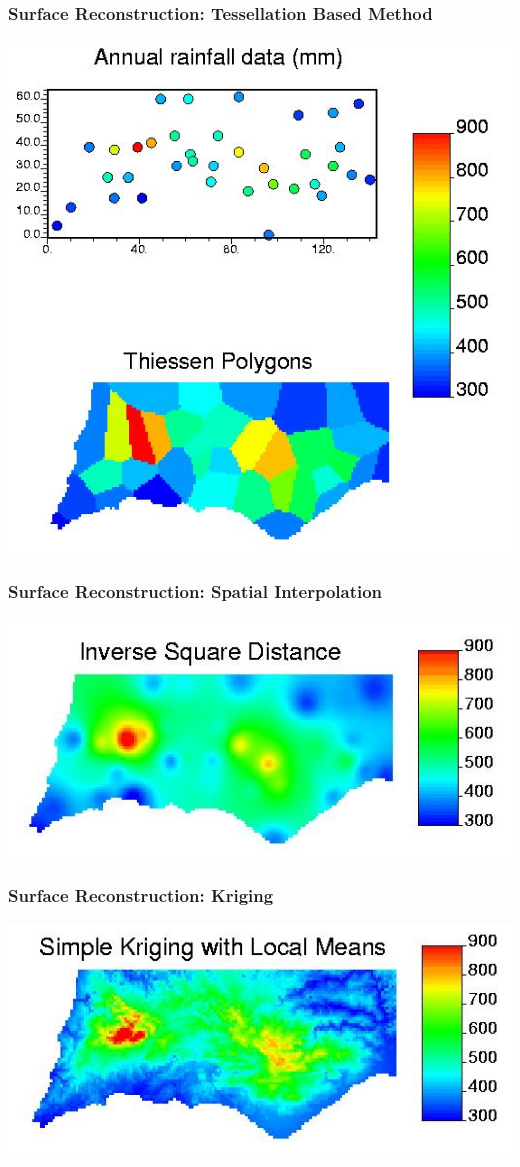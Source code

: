 \documentclass[nototal,handout]{beamer}
\begin{document}
\begin{frame}
    \frametitle{Surface Reconstruction: Tessellation Based Method}
    \begin{center}
      \includegraphics[width=.65\linewidth]{pg2.jpg}
    \end{center}
  \end{frame}
\begin{frame}
    \frametitle{Surface Reconstruction: Spatial Interpolation}
    \begin{center}
      \includegraphics[width=.65\linewidth]{pg3.jpg}
    \end{center}
  \end{frame}
\begin{frame}
    \frametitle{Surface Reconstruction: Kriging}
    \begin{center}
      \includegraphics[width=.65\linewidth]{pg4.jpg}
    \end{center}
  \end{frame}
\end{document}

